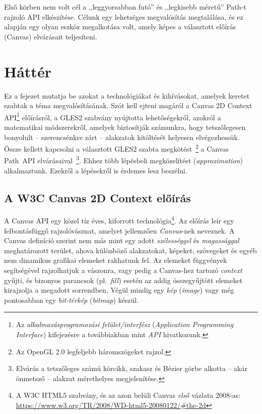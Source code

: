 \documentclass[12pt]{report}
\theoremstyle{definition}
\newcommand{\inenglish}[1]{\textsl{#1}}
\begin{document}
Első körben nem volt cél a ,,leggyorsabban futó'' és ,,legkisebb méretű''
Path-t rajzoló API elkészítése. Célunk egy lehetséges megvalósítás megtalálása,
és ez alapján egy olyan eszköz megalkotása volt, amely képes a választott
előírás (Canvas) elvárásait teljesíteni.



    \chapter{Háttér}
    \label{Háttér}

Ez a fejezet mutatja be azokat a technológiákat és kihívásokat, amelyek keretet
szabtak a téma megvalósításának. Szót kell ejteni magáról a Canvas 2D Context
API\footnote{Az \emph{alkalmazásprogramozási felület/interfész}
(\inenglish{Application Programming Interface}) kifejezésre a továbbiakban mint
\emph{API} hivatkozunk.} előírásról, a GLES2 szabvány nyújtotta lehetőségekről,
azokról a matematikai módszerekről, amelyek biztosítják számunkra, hogy
tetszőlegesen bonyolult -- szerencsénkre zárt -- alakzatok kitöltését helyesen
elvégezhessük. Össze kellett kapcsolni a választott GLES2 szabta
megkötést~\footnote { Az OpenGL 2.0 legfeljebb háromszögeket rajzol. } a Canvas
Path~API elvárásaival~\footnote { Elvárás a tetszőleges számú körcikk, szakasz
és Bézier görbe alkotta -- akár önmetsző -- alakzat mérethelyes megjelenítése.
}. Ehhez több lépésbeli megközelítést (\inenglish{approximation}) alkalmaztunk.
Ezekről a lépésekről is érdemes lesz beszélni.

    \section[A Canvas 2D Context előírás]{A W3C Canvas 2D Context előírás}
    \label{A Canvas előírás}

A Canvas API egy közel tíz éves, kiforrott technológia\footnote {A W3C HTML5
szabvány, és az azon belüli Canvas \emph{első} vázlata 2008-as:\\
\footnotesize{ \url{https://www.w3.org/TR/2008/WD-html5-20080122/\#the-2d}} }.
Az előírás leír egy felbontásfüggő rajzolóvásznat, amelyet jellemzően
\emph{Canvas}-nek neveznek. A Canvas definíció szerint nem más mint egy adott
\emph{szélességgel} és \emph{magassággal} meghatározott terület, ahova
különböző alakzatokat, képeket, szövegeket és egyéb nem dinamikus grafikai
elemeket rakhatunk fel. Az elemeket függvények segítségével rajzolhatjuk a
vászonra, vagy pedig a Canvas-hez tartozó \emph{context} gyűjti, és bizonyos
parancsok (pl.~\emph{fill}) esetén az addig összegyűjtött elemeket kirajzolja a
megadott sorrendben. Végül mindig egy \emph{kép} (\inenglish{image}) vagy még
pontosabban egy \emph{bit-térkép} (\inenglish{bitmap}) készül.
\end{document}
